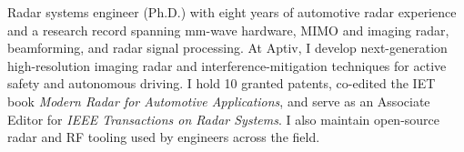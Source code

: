 
\begin{cvparagraph}
    Radar systems engineer (Ph.D.) with eight years of automotive radar experience and a research record spanning mm-wave hardware, MIMO and imaging radar, beamforming, and radar signal processing. At Aptiv, I develop next-generation high-resolution imaging radar and interference-mitigation techniques for active safety and autonomous driving. I hold 10 granted patents, co-edited the IET book \emph{Modern Radar for Automotive Applications}, and serve as an Associate Editor for \emph{IEEE Transactions on Radar Systems}. I also maintain open-source radar and RF tooling used by engineers across the field.
\end{cvparagraph}
